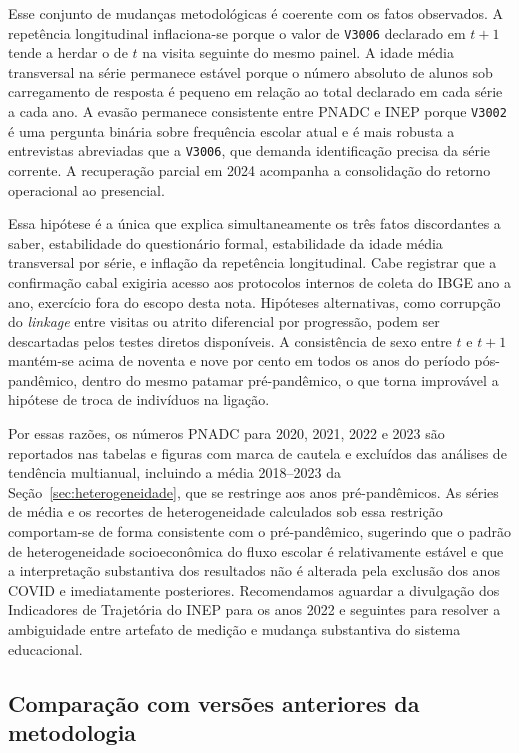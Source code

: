 Esse conjunto de mudanças metodológicas é coerente com os
fatos observados. A repetência longitudinal inflaciona-se
porque o valor de \texttt{V3006} declarado em $t+1$ tende
a herdar o de $t$ na visita seguinte do mesmo painel. A
idade média transversal na série permanece estável porque
o número absoluto de alunos sob carregamento de resposta
é pequeno em relação ao total declarado em cada série a
cada ano. A evasão permanece consistente entre PNADC e INEP
porque \texttt{V3002} é uma pergunta binária sobre frequência
escolar atual e é mais robusta a entrevistas abreviadas que
a \texttt{V3006}, que demanda identificação precisa da
série corrente. A recuperação parcial em 2024 acompanha a
consolidação do retorno operacional ao presencial.

Essa hipótese é a única que explica simultaneamente os três
fatos discordantes a saber, estabilidade do questionário
formal, estabilidade da idade média transversal por série, e
inflação da repetência longitudinal. Cabe registrar que a
confirmação cabal exigiria acesso aos protocolos internos
de coleta do IBGE ano a ano, exercício fora do escopo desta
nota. Hipóteses alternativas, como corrupção do
\emph{linkage} entre visitas ou atrito diferencial por
progressão, podem ser descartadas pelos testes diretos
disponíveis. A consistência de sexo entre $t$ e $t+1$
mantém-se acima de noventa e nove por cento em todos os
anos do período pós-pandêmico, dentro do mesmo patamar
pré-pandêmico, o que torna improvável a hipótese de troca
de indivíduos na ligação.

Por essas razões, os números PNADC para 2020, 2021, 2022 e
2023 são reportados nas tabelas e figuras com marca de
cautela e excluídos das análises de tendência multianual,
incluindo a média 2018--2023 da
Seção~\ref{sec:heterogeneidade}, que se restringe aos anos
pré-pandêmicos. As séries de média e os recortes de
heterogeneidade calculados sob essa restrição comportam-se
de forma consistente com o pré-pandêmico, sugerindo que o
padrão de heterogeneidade socioeconômica do fluxo escolar é
relativamente estável e que a interpretação substantiva dos
resultados não é alterada pela exclusão dos anos COVID e
imediatamente posteriores. Recomendamos aguardar a divulgação
dos Indicadores de Trajetória do INEP para os anos 2022 e
seguintes para resolver a ambiguidade entre artefato de
medição e mudança substantiva do sistema educacional.

\subsection{Comparação com versões anteriores da metodologia}
\label{ssec:efeito_ferias}

